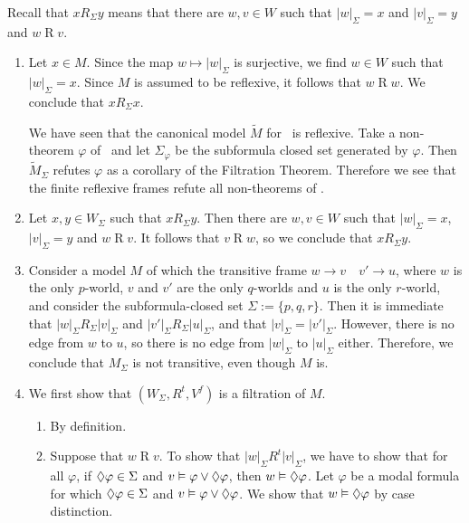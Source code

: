 \documentclass{article}
\begin{document}
\maketitle

\begin{ex}
Recall that $x\mathbin{R_\Sigma}y$ means that there are $w,v\in W$ such
that $|w|_\Sigma=x$ and $|v|_\Sigma=y$ and $w\mathbin{R} v$.
\begin{enumerate}
\item Let $x\in M$. Since
the map $w\mapsto |w|_\Sigma$ is surjective, we find $w\in W$ such that $|w|_\Sigma=x$.
Since $M$ is assumed to be reflexive, it follows that $w\mathbin{R} w$. We 
conclude that $x\mathbin{R_\Sigma} x$.

We have seen that the canonical model $\tilde{M}$ for \KT~is reflexive. Take a
non-theorem $\varphi$ of \KT~and let $\Sigma_\varphi$ be the subformula closed
set generated by $\varphi$. Then $\tilde{M}_\Sigma$ refutes $\varphi$ as a
corollary of the Filtration Theorem. Therefore we see that the finite 
reflexive frames refute all non-theorems of \KT.
\item Let $x,y\in W_\Sigma$ such that $x\mathbin{R_\Sigma}y$. Then there are
$w,v\in W$ such that $|w|_\Sigma=x$, $|v|_\Sigma=y$ and $w\mathbin{R} v$. It
follows that $v\mathbin{R} w$, so we conclude that $x\mathbin{R_\Sigma} y$.
\item Consider a model $M$ of which the transitive frame $w\to v\quad v'\to u$, where $w$ is the only $p$-world,
$v$ and $v'$ are the only $q$-worlds and $u$ is the only $r$-world, and consider
the subformula-closed set $\Sigma:=\{p,q,r\}$. Then it is immediate that
$|w|_\Sigma\mathbin{R_\Sigma}|v|_\Sigma$ and $|v'|_\Sigma\mathbin{R_\Sigma}|u|_\Sigma$,
and that $|v|_\Sigma=|v'|_\Sigma$. However, there is no edge from $w$ to $u$, so
there is no edge from $|w|_\Sigma$ to $|u|_\Sigma$ either. Therefore, we conclude
that $M_\Sigma$ is not transitive, even though $M$ is.
\item We first show that $(W_\Sigma,R^t,V^f)$ is a filtration of $M$. 
\begin{enumerate}
\item By definition.
\item Suppose that $w\mathbin{R} v$. To show that $|w|_\Sigma\mathbin{R^t}|v|_\Sigma$,
we have to show that for all $\varphi$, if $\lozenge\varphi\in\Sigma$ and
$v\vDash\varphi\lor\lozenge\varphi$, then $w\vDash\lozenge\varphi$. Let $\varphi$ be
a modal formula for which $\lozenge\varphi\in\Sigma$ and $v\vDash\varphi\lor\lozenge\varphi$.
We show that $w\vDash\lozenge\varphi$ by case distinction. 

\end{enumerate}
\end{enumerate}
\end{ex}
\end{document}
